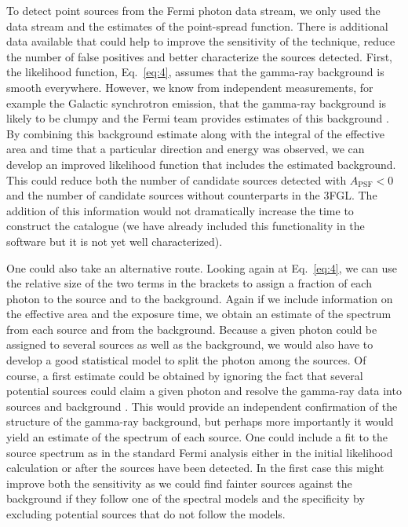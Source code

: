 \documentclass[useAMS,usenatbib]{mn2e}
\begin{document}
To detect point sources from the Fermi photon data stream, we only
used the data stream and the estimates of the point-spread
function. There is additional data available that could help to
improve the sensitivity of the technique, reduce the number of false
positives and better characterize the sources detected.  First, the
likelihood function, Eq.~\ref{eq:4}, assumes that the gamma-ray
background is smooth everywhere.  However, we know from independent
measurements, for example the Galactic synchrotron emission, that the
gamma-ray background is likely to be clumpy and the Fermi team
provides estimates of this background \citep[e.g.][]{Fermi1602.07246}.
By combining this background
estimate along with the integral of the effective area and time that a
particular direction and energy was observed, we can develop an
improved likelihood function that includes the estimated background.
This could reduce both the number of candidate sources detected with
$A_\mathrm{PSF}<0$ and the number of candidate sources without
counterparts in the 3FGL.  The addition of this information would not
dramatically increase the time to construct the catalogue (we have
already included this functionality in the software but it is not yet
well characterized).

One could also take an alternative route.  Looking again at
Eq.~\ref{eq:4}, we can use the relative size of the two terms in the
brackets to assign a fraction of each photon to the source and to the
background.  Again if we include information on the effective area and
the exposure time, we obtain an estimate of the spectrum from each
source and from the background.  Because a given photon could be
assigned to several sources as well as the background, we would also
have to develop a good statistical model to split the photon among the
sources.  Of course, a first estimate could be obtained by ignoring
the fact that several potential sources could claim a given photon and
resolve the gamma-ray data into sources and background \citep[as done
  by][]{2015A&A...581A.126S}. This would provide an independent
confirmation of the structure of the gamma-ray background, but perhaps
more importantly it would yield an estimate of the spectrum of each
source. One could include a fit to the source spectrum as in the
standard Fermi analysis either in the initial likelihood calculation
or after the sources have been detected.  In the first case this might
improve both the sensitivity as we could find fainter sources against
the background if they follow one of the spectral models and the
specificity by excluding potential sources that do not follow the
models.
\end{document}
